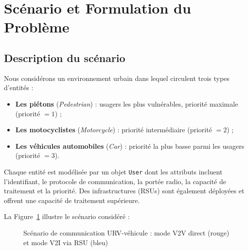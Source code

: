 \documentclass[12pt,a4paper]{article}
\begin{document}
\section{Scénario et Formulation du Problème}
\label{sec:scenario}

\subsection{Description du scénario}

Nous considérons un environnement urbain dans lequel circulent trois types d'entités :
\begin{itemize}[leftmargin=*]
  \item \textbf{Les piétons} (\textit{Pedestrian}) : usagers les plus vulnérables,
        priorité maximale (priorité $= 1$) ;
  \item \textbf{Les motocyclistes} (\textit{Motorcycle}) : priorité intermédiaire
        (priorité $= 2$) ;
  \item \textbf{Les véhicules automobiles} (\textit{Car}) : priorité la plus basse
        parmi les usagers (priorité $= 3$).
\end{itemize}

Chaque entité est modélisée par un objet \texttt{User} dont les attributs incluent
l'identifiant, le protocole de communication, la portée radio, la capacité de
traitement et la priorité. Des infrastructures (RSUs) sont également déployées et
offrent une capacité de traitement supérieure.

La Figure~\ref{fig:scenario} illustre le scénario considéré :

\begin{figure}[H]
\centering
{}
\caption{Scénario de communication URV-véhicule : mode V2V direct (rouge) et
mode V2I via RSU (bleu)}
\label{fig:scenario}
\end{figure}
\end{document}
